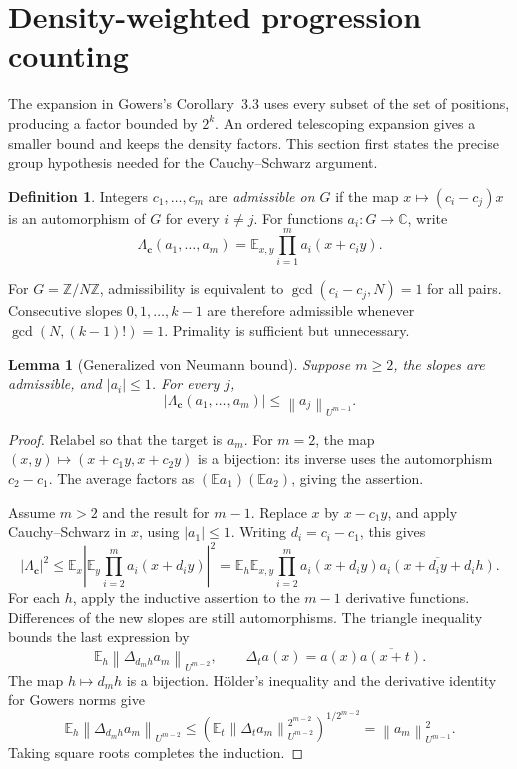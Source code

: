 \documentclass[11pt,letterpaper]{article}
\numberwithin{equation}{section}
\newtheorem{lemma}[theorem]{Lemma}
\theoremstyle{definition}
\newtheorem{definition}[theorem]{Definition}
\theoremstyle{remark}
\newcommand{\E}{\mathbb E}
\newcommand{\Z}{\mathbb Z}
\newcommand{\C}{\mathbb C}
\newcommand{\1}{\mathbf 1}
\newcommand{\norm}[1]{\left\|#1\right\|}
\newcommand{\srctag}[1]{\texorpdfstring{\enspace\textup{[#1]}}{ [#1]}}
\newcommand{\srcnote}[2]{\par\noindent{\small\textit{Source #1, delivered #2.}}\par}
\begin{document}

\section[{Density-weighted progression counting\srctag{04}}]{Density-weighted progression counting}\label{gsr:cc:04:sec:d7}
\srcnote{04}{Section 7}
\label{gsr:cc:04:sec:progressions}

The expansion in Gowers's Corollary~3.3 uses every subset of the set of
positions, producing a factor bounded by \(2^k\).  An ordered telescoping
expansion gives a smaller bound and keeps the density factors.  This
section first states the precise group hypothesis needed for the
Cauchy--Schwarz argument.

\begin{definition}
Integers \(c_1,\ldots,c_m\) are \emph{admissible on \(G\)} if
the map \(x\mapsto(c_i-c_j)x\) is an automorphism of \(G\) for every
\(i\ne j\).  For functions \(a_i:G\to\C\), write
\[
 \Lambda_{\mathbf c}(a_1,\ldots,a_m)
  =\E_{x,y}\prod_{i=1}^m a_i(x+c_i y).
\]
\end{definition}

For \(G=\Z/N\Z\), admissibility is equivalent to
\(\gcd(c_i-c_j,N)=1\) for all pairs.  Consecutive slopes
\(0,1,\ldots,k-1\) are therefore admissible whenever
\(\gcd(N,(k-1)!)=1\).  Primality is sufficient but unnecessary.

\begin{lemma}[Generalized von Neumann bound]\label{gsr:cc:04:prog:gvn}
Suppose \(m\geq2\), the slopes are admissible, and \(|a_i|\leq1\).
For every \(j\),
\[
 |\Lambda_{\mathbf c}(a_1,\ldots,a_m)|
 \leq \norm{a_j}_{U^{m-1}}.
\]
\end{lemma}

\begin{proof}
Relabel so that the target is \(a_m\).  For \(m=2\), the map
\((x,y)\mapsto(x+c_1y,x+c_2y)\) is a bijection: its inverse uses the
automorphism \(c_2-c_1\).  The average factors as
\((\E a_1)(\E a_2)\), giving the assertion.

Assume \(m>2\) and the result for \(m-1\).  Replace \(x\) by
\(x-c_1y\), and apply Cauchy--Schwarz in \(x\), using \(|a_1|\leq1\).
Writing \(d_i=c_i-c_1\), this gives
\[
 |\Lambda_{\mathbf c}|^2
 \leq \E_x\left|\E_y\prod_{i=2}^m a_i(x+d_i y)\right|^2
 =\E_h\E_{x,y}
    \prod_{i=2}^m a_i(x+d_i y)
      \overline{a_i(x+d_i y+d_i h)}.
\]
For each \(h\), apply the inductive assertion to the \(m-1\)
derivative functions.  Differences of the new slopes are still
automorphisms.  The triangle inequality bounds the last expression by
\[
 \E_h\norm{\Delta_{d_mh}a_m}_{U^{m-2}},
 \qquad \Delta_ta(x)=a(x)\overline{a(x+t)}.
\]
The map \(h\mapsto d_mh\) is a bijection.  H\"older's inequality and
the derivative identity for Gowers norms give
\[
 \E_h\norm{\Delta_{d_mh}a_m}_{U^{m-2}}
 \leq
 \left(\E_t\norm{\Delta_ta_m}_{U^{m-2}}^{2^{m-2}}\right)^{1/2^{m-2}}
 =\norm{a_m}_{U^{m-1}}^2.
\]
Taking square roots completes the induction.
\end{proof}
\end{document}
